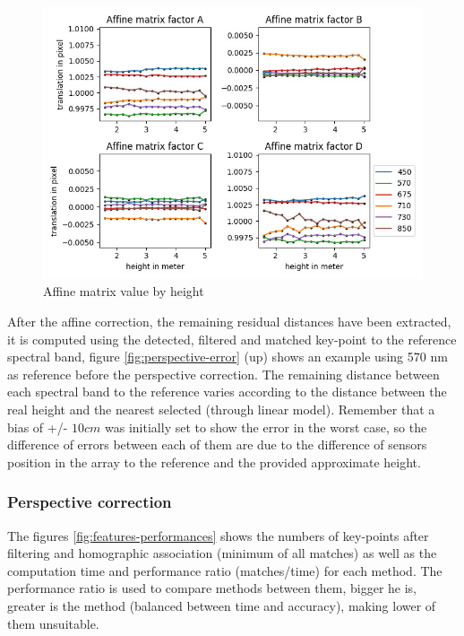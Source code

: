 \documentclass[../thesis.tex]{subfiles}
\begin{document}
	\begin{figure}[H]
		\centering
		\includegraphics[width=0.8\linewidth]{img/registration/affine-rotation-height}
		\caption{Affine matrix value by height}
		\label{fig:affine-rotation-height}
	\end{figure}
	
	After the affine correction, the remaining residual distances have been extracted,
	it is computed using the detected, filtered and matched key-point to the reference spectral band,
	figure \ref{fig:perspective-error} (up) %
	shows an example using 570 nm as reference before the perspective correction.
	The remaining distance between each spectral band to the reference varies according to the distance between
	the real height and the nearest selected (through linear model).
	Remember that a bias of +/- $10cm$ was initially set to show the error in the worst case,
	so the difference of errors between each of them are due to the difference of sensors position in the array to the reference and the provided approximate height.
	
	
	\subsubsection{Perspective correction}
	
	The figures \ref{fig:features-performances} shows the numbers of key-points after filtering and homographic association (minimum of all matches)
	as well as the computation time and performance ratio (matches/time) for each method.
	The performance ratio is used to compare methods between them, bigger he is,
	greater is the method (balanced between time and accuracy), making lower of them unsuitable.
	
\end{document}
